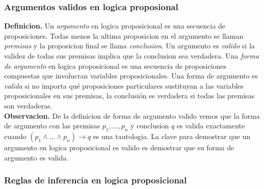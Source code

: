 \documentclass[]{article}
\begin{document}
\subsubsection*{Argumentos validos en logica proposional}

\textbf{Definicion.} Un \textit{argumento} en logica proposicional es una secuencia de proposiciones. Todas menos la ultima proposicion en el argumento se llaman \textit{premisas} y la proposicion final se llama \textit{conclusion}. Un argumento es \textit{valido} si la validez de todas sus premisas implica que la conclusion sea verdadera.
Una \textit{forma de argumento} en logica proposicional es una secuencia de proposiciones compuestas que involucran variables proposicionales. Una forma de argumento es \textit{valida} si no importa qué proposiciones particulares sustituyan a las variables proposicionales en sus premisas, la conclusión es verdadera si todas las premisas son verdaderas.\\

\textbf{Observacion.} De la definicion de forma de argumento valido vemos que la forma de argumento con las premisas $p_{1}, ..., p_{n}$ y conclusion $q$ es valida exactamente cuando $(p_{1} \wedge ... \wedge p_{n}) \rightarrow q$ es una tautologia.
La clave para demostrar que un argumento en logica proposicional es valido es demostrar que su forma de argumento es valida.

\subsubsection*{Reglas de inferencia en logica proposicional}
\end{document}
